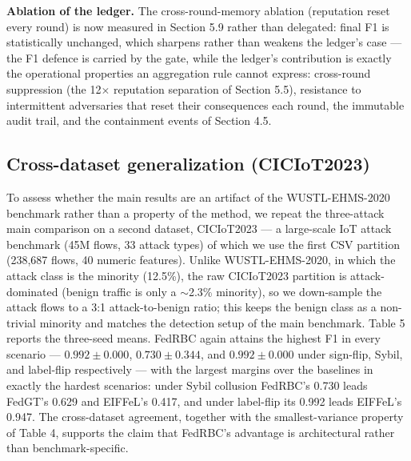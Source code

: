 \documentclass[cmc,article,submit,moreauthors,pdftex]{Definitions/tsp}
\begin{document}
\textbf{Ablation of the ledger.} The cross-round-memory ablation (reputation reset every round) is now measured in Section 5.9 rather than delegated: final F1 is statistically unchanged, which sharpens rather than weakens the ledger's case --- the F1 defence is carried by the gate, while the ledger's contribution is exactly the operational properties an aggregation rule cannot express: cross-round suppression (the 12$\times$ reputation separation of Section 5.5), resistance to intermittent adversaries that reset their consequences each round, the immutable audit trail, and the containment events of Section 4.5.

\subsection{Cross-dataset generalization (CICIoT2023)}\label{sec:cross-dataset-generalization-ciciot2023}

To assess whether the main results are an artifact of the WUSTL-EHMS-2020 benchmark rather than a property of the method, we repeat the three-attack main comparison on a second dataset, CICIoT2023 \cite{ref-52} --- a large-scale IoT attack benchmark (45M flows, 33 attack types) of which we use the first CSV partition (238,687 flows, 40 numeric features). Unlike WUSTL-EHMS-2020, in which the attack class is the minority (12.5\%), the raw CICIoT2023 partition is attack-dominated (benign traffic is only a $\sim$2.3\% minority), so we down-sample the attack flows to a 3:1 attack-to-benign ratio; this keeps the benign class as a non-trivial minority and matches the detection setup of the main benchmark. Table 5 reports the three-seed means. FedRBC again attains the highest F1 in every scenario --- $0.992 \pm 0.000$, $0.730 \pm 0.344$, and $0.992 \pm 0.000$ under sign-flip, Sybil, and label-flip respectively --- with the largest margins over the baselines in exactly the hardest scenarios: under Sybil collusion FedRBC's 0.730 leads FedGT's 0.629 and EIFFeL's 0.417, and under label-flip its 0.992 leads EIFFeL's 0.947. The cross-dataset agreement, together with the smallest-variance property of Table 4, supports the claim that FedRBC's advantage is architectural rather than benchmark-specific.
\end{document}

